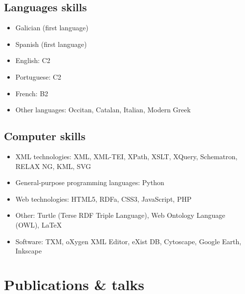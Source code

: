 \documentclass[11pt, a4paper]{article}
\begin{document}
\subsection{Languages skills}
\begin{itemize}[noitemsep]
 \item Galician (first language)
 \item Spanish (first language)
 \item English: C2
 \item Portuguese: C2
 \item French: B2
 \item Other languages: Occitan, Catalan, Italian, Modern Greek
\end{itemize}


\subsection{Computer skills}
\begin{itemize}[noitemsep]
 \item XML technologies: XML, XML-TEI, XPath, XSLT, XQuery, Schematron, RELAX NG, KML, SVG
 \item General-purpose programming languages: Python
 \item Web technologies: HTML5, RDFa, CSS3, JavaScript, PHP
 \item Other: Turtle (Terse RDF Triple Language), Web Ontology Language (OWL), LaTeX
 \item Software: TXM, oXygen XML Editor, eXist DB, Cytoscape, Google Earth, Inkscape 
\end{itemize}



\section{Publications \& talks}
\end{document}
